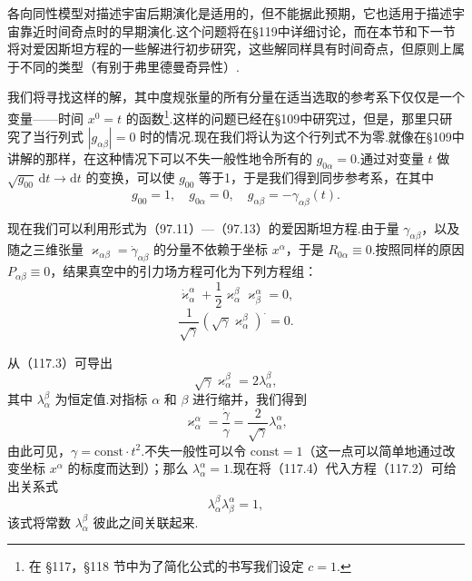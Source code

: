 各向同性模型对描述宇宙后期演化是适用的，但不能据此预期，它也适用于描述宇宙靠近时间奇点时的早期演化.这个问题将在§119中详细讨论，而在本节和下一节将对爱因斯坦方程的一些解进行初步研究，这些解同样具有时间奇点，但原则上属于不同的类型（有别于弗里德曼奇异性）.

我们将寻找这样的解，其中度规张量的所有分量在适当选取的参考系下仅仅是一个变量——时间 $x^{0}=t$ 的函数\footnote{在 §117，§118 节中为了简化公式的书写我们设定 $c=1$.}.这样的问题已经在§109中研究过，但是，那里只研究了当行列式 $|g_{\alpha\beta}|=0$ 时的情况.现在我们将认为这个行列式不为零.就像在§109中讲解的那样，在这种情况下可以不失一般性地令所有的 $g_{0\alpha}=0$.通过对变量 $t$ 做 $\sqrt{g_{00}}\,\mathrm{d}t\to\mathrm{d}t$ 的变换，可以使 $g_{00}$ 等于1，于是我们得到同步参考系，在其中
\begin{equation}
  g_{00}=1,\quad g_{0\alpha}=0,\quad
  g_{\alpha\beta}=-\gamma_{\alpha\beta}(t).
\end{equation}

现在我们可以利用形式为（97.11）—（97.13）的爱因斯坦方程.由于量 $\gamma_{\alpha\beta}$，以及随之三维张量 $\varkappa_{\alpha\beta}=\dot{\gamma}_{\alpha\beta}$ 的分量不依赖于坐标 $x^{\alpha}$，于是 $R_{0\alpha}\equiv0$.按照同样的原因 $P_{\alpha\beta}\equiv0$，结果真空中的引力场方程可化为下列方程组：
\begin{equation}
  \dot{\varkappa}_{\alpha}^{\alpha}
  +\frac{1}{2}\varkappa_{\alpha}^{\beta}\varkappa_{\beta}^{\alpha}=0,
\end{equation}
\begin{equation}
  \frac{1}{\sqrt{\gamma}}
  (\sqrt{\gamma}\varkappa_{\alpha}^{\beta})^{\cdot}=0.
\end{equation}

从（117.3）可导出
\begin{equation}
  \sqrt{\gamma}\varkappa_{\alpha}^{\beta}=2\lambda_{\alpha}^{\beta},
\end{equation}
其中 $\lambda_{\alpha}^{\beta}$ 为恒定值.对指标 $\alpha$ 和 $\beta$ 进行缩并，我们得到
\begin{equation*}
  \varkappa_{\alpha}^{\alpha}=\frac{\dot{\gamma}}{\gamma}
  =\frac{2}{\sqrt{\gamma}}\lambda_{\alpha}^{\alpha},
\end{equation*}
由此可见，$\gamma=\mathrm{const}\cdot t^{2}$.不失一般性可以令 $\mathrm{const}=1$（这一点可以简单地通过改变坐标 $x^{\alpha}$ 的标度而达到）；那么 $\lambda_{\alpha}^{\alpha}=1$.现在将（117.4）代入方程（117.2）可给出关系式
\begin{equation}
  \lambda_{\alpha}^{\beta}\lambda_{\beta}^{\alpha}=1,
\end{equation}
该式将常数 $\lambda_{\alpha}^{\beta}$ 彼此之间关联起来.

